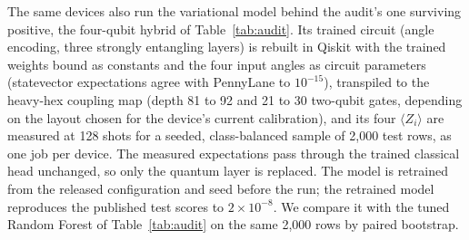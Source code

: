 The same devices also run the variational model behind the audit's one surviving positive, the
four-qubit hybrid of Table~\ref{tab:audit}. Its trained circuit (angle encoding, three strongly
entangling layers) is rebuilt in Qiskit with the trained weights bound as constants and the four input
angles as circuit parameters (statevector expectations agree with PennyLane to $10^{-15}$), transpiled to
the heavy-hex coupling map (depth 81 to 92 and 21 to 30 two-qubit gates, depending on the layout chosen
for the device's current calibration), and its four $\langle Z_i\rangle$ are measured at 128 shots for a
seeded, class-balanced sample of 2{,}000 test rows, as one job per device. The measured expectations pass
through the trained classical head unchanged, so only the quantum layer is replaced. The model is
retrained from the released configuration and seed before the run; the retrained model reproduces the
published test scores to $2\times10^{-8}$. We compare it with the tuned Random Forest of
Table~\ref{tab:audit} on the same 2{,}000 rows by paired bootstrap.

